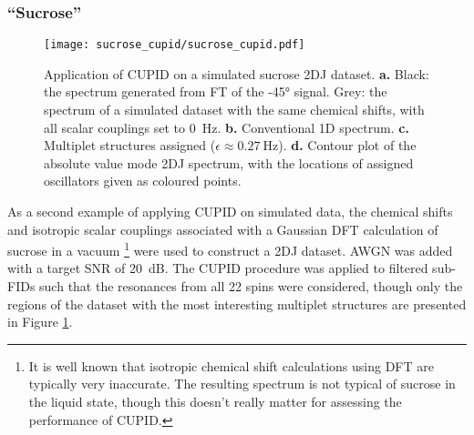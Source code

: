 \subsubsection{``Sucrose''}
\begin{figure}
    \centering
    \texttt{[image: sucrose\_cupid/sucrose\_cupid.pdf]}
    \caption[
        Application of \acs{CUPID} on a simulated sucrose \acs{2DJ} dataset.
    ]
    {
        Application of \ac{CUPID} on a simulated sucrose \ac{2DJ} dataset.
        \textbf{a.} Black: the spectrum generated from \ac{FT} of the \ang{-45}
        signal. Grey: the spectrum of a simulated dataset with the same
        chemical shifts, with all scalar couplings set to \qty{0}{\hertz}.
        \textbf{b.} Conventional \ac{1D} spectrum.
        \textbf{c.} Multiplet structures assigned ($\epsilon \approx
        \qty{0.27}{\hertz}$).
        \textbf{d.} Contour plot of the absolute value mode \ac{2DJ} spectrum,
        with the locations of assigned oscillators given as coloured points.
    }
    \label{fig:sucrose-cupid}
\end{figure}
As a second example of applying \ac{CUPID} on simulated data, the chemical
shifts and isotropic scalar couplings associated with a
Gaussian\cite{Gaussian03} \ac{DFT} calculation of sucrose in a vacuum
\footnote{
It is well known that isotropic chemical shift calculations using \ac{DFT} are
typically very inaccurate. The resulting spectrum is not typical of sucrose in
the liquid state, though this doesn't really matter for assessing the
performance of \ac{CUPID}.
}
were used to construct a 2DJ dataset. \ac{AWGN} was added with a target
\ac{SNR} of \qty{20}{\deci\bel}. The CUPID procedure was applied to filtered
sub-FIDs such that the resonances from all 22 spins were considered, though
only the regions of the dataset with the most interesting multiplet structures
are presented in Figure \ref{fig:sucrose-cupid}.

